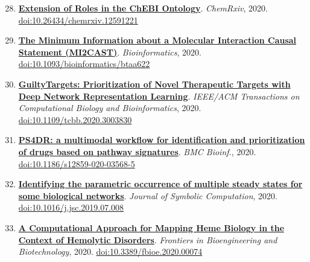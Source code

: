\documentclass[10pt,a4paper,sans]{moderncv} %
\newcommand{\wikidata}[2]{\href{https://bioregistry.io/wikidata:#1}{{#2}}}
\begin{document}
    \begin{enumerate}
    \setcounter{enumi}{27}
    \itemsep0.5em
        \item
            \wikidata{Q96909013}{\textbf{Extension of Roles in the ChEBI Ontology}}.
    \textit{ChemRxiv}, 2020.  {\scriptsize \href{https://bioregistry.io/doi:10.26434/CHEMRXIV.12591221}{doi:10.26434/chemrxiv.12591221}}
        \item
            \wikidata{Q97063807}{\textbf{The Minimum Information about a Molecular Interaction Causal Statement (MI2CAST)}}.
    \textit{Bioinformatics}, 2020.  {\scriptsize \href{https://bioregistry.io/doi:10.1093/BIOINFORMATICS/BTAA622}{doi:10.1093/bioinformatics/btaa622}}
        \item
            \wikidata{Q98200725}{\textbf{GuiltyTargets: Prioritization of Novel Therapeutic Targets with Deep Network Representation Learning}}.
    \textit{IEEE/ACM Transactions on Computational Biology and Bioinformatics}, 2020.  {\scriptsize \href{https://bioregistry.io/doi:10.1109/TCBB.2020.3003830}{doi:10.1109/tcbb.2020.3003830}}
        \item
            \wikidata{Q96169295}{\textbf{PS4DR: a multimodal workflow for identification and prioritization of drugs based on pathway signatures}}.
    \textit{BMC Bioinf.}, 2020.  {\scriptsize \href{https://bioregistry.io/doi:10.1186/S12859-020-03568-5}{doi:10.1186/s12859-020-03568-5}}
        \item
            \wikidata{Q118952373}{\textbf{Identifying the parametric occurrence of multiple steady states for some biological networks}}.
    \textit{Journal of Symbolic Computation}, 2020.  {\scriptsize \href{https://bioregistry.io/doi:10.1016/J.JSC.2019.07.008}{doi:10.1016/j.jsc.2019.07.008}}
        \item
            \wikidata{Q90643177}{\textbf{A Computational Approach for Mapping Heme Biology in the Context of Hemolytic Disorders}}.
    \textit{Frontiers in Bioengineering and Biotechnology}, 2020.  {\scriptsize \href{https://bioregistry.io/doi:10.3389/FBIOE.2020.00074}{doi:10.3389/fbioe.2020.00074}}
    \end{enumerate}
\end{document}
